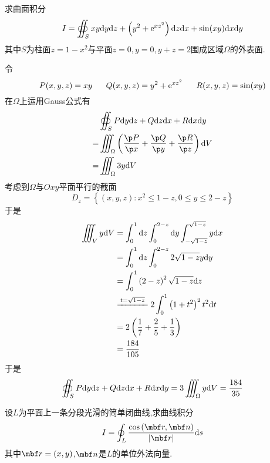\documentclass{ctexart}
\begin{document}
\begin{problem}[5.(10\songti{分})]
    求曲面积分
    \[I=\oiint_{S}xy\mathrm{d} y\mathrm{d} z+\left(y^2+\mathrm{e}^{xz^2}\right)\mathrm{d} z\mathrm{d} x+\sin(xy)\mathrm{d} x\mathrm{d} y\]
    其中$S$为柱面$z=1-x^2$与平面$z=0,y=0,y+z=2$围成区域$\Omega$的外表面.
\end{problem}
\begin{solution}
    令
    \[P(x,y,z)=xy\ \ \ \ \ Q(x,y,z)=y^2+\e^{xz^2}\ \ \ \ \ R(x,y,z)=\sin(xy)\]
    在$\Omega$上运用Gauss公式有
    \[\begin{aligned}
        &\oiint_SP\di y\di z+Q\di z\dx+R\dx\di y \\
        =&\iiint_{\Omega}\left(\dfrac{\p P}{\p x}+\dfrac{\p Q}{\p y}+\dfrac{\p R}{\p z}\right)\di V \\
        =&\iiint_{\Omega}3y\di V
    \end{aligned}\]
    考虑到$\Omega$与$Oxy$平面平行的截面
    \[D_z=\left\{(x,y,z):x^2\leqslant 1-z,0\leqslant y\leqslant 2-z\right\}\]
    于是
    \[\begin{aligned}
        \iiint_Vy\di V
        &= \int_0^1\di z\int_0^{2-z}\di y\int_{-\sqrt{1-z}}^{\sqrt{1-z}}y\dx \\
        &= \int_0^1\di z\int_0^{2-z}2\sqrt{1-z}y\di y \\
        &= \int_0^1\left(2-z\right)^2\sqrt{1-z}\di z \\
        &\xlongequal{t=\sqrt{1-z}}2\int_0^1\left(1+t^2\right)^2t^2\di t \\
        &= 2\left(\dfrac17+\dfrac{2}{5}+\dfrac13\right) \\
        &= \dfrac{184}{105}
    \end{aligned}\]
    于是
    \[\oiint_SP\mathrm{d} y\mathrm{d} z+Q\mathrm{d} z\mathrm{d} x+R\mathrm{d} x\mathrm{d} y=3\iiint_{\Omega}y\mathrm{d} V=\dfrac{184}{35}\]

\end{solution}
\begin{problem}[6.(10\songti{分})]
    设$L$为平面上一条分段光滑的简单闭曲线,求曲线积分
    \[I=\oint_{L}\dfrac{\cos\left(\mbf r,\mbf n\right)}{\left|\mbf r\right|}\di s\]
    其中$\mbf r=(x,y)$,$\mbf n$是$L$的单位外法向量.
\end{problem}
\end{document}
